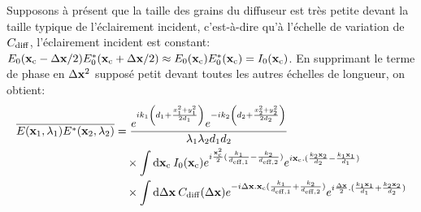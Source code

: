Supposons à présent que la taille des grains du diffuseur est très petite devant la taille typique de l'éclairement incident, c'est-à-dire qu'à l'échelle de variation de $C_{\mathrm{diff}}$, l'éclairement incident est constant: $E_0(\mathbf{x}_{\mathrm{c}}-\Delta\mathbf{x}/2) E_0^*(\mathbf{x}_{\mathrm{c}}+\Delta\mathbf{x}/2) \approx E_0(\mathbf{x}_{\mathrm{c}}) E_0^*(\mathbf{x}_{\mathrm{c}}) = I_0(\mathbf{x}_{\mathrm{c}})$. En supprimant le terme de phase en $\Delta\mathbf{x}^2$ supposé petit devant toutes les autres échelles de longueur, on obtient:
\begin{align}
\overline{E(\mathbf{x}_1,\lambda_1)E^*(\mathbf{x}_2,\lambda_2)} &= \frac{e^{ik_1\left( d_1 + \frac{x_1^2+y_1^2}{2d_1} \right)} e^{-ik_2 \left( d_2 + \frac{x_2^2+y_2^2}{2d_2}\right)}}{\lambda_1 \lambda_2 d_1 d_2} \\
\nonumber & \quad \times \int{\mathop{}\mathopen{}\mathrm{d}\mathbf{x}_{\mathrm{c}}\: I_0(\mathbf{x}_{\mathrm{c}}) e^{i\frac{\mathbf{x}_{\mathrm{c}}^2}{2}(\frac{k_1}{d_{\mathrm{eff,1}}} - \frac{k_2}{d_{\mathrm{eff,2}}})} e^{i \mathbf{x}_{\mathrm{c}}. (\frac{k_2 \mathbf{x}_2}{d_2}-\frac{k_1 \mathbf{x}_1}{d_1})}} \\
\nonumber & \quad \times \int{\mathop{}\mathopen{}\mathrm{d}\Delta\mathbf{x}\: C_{\mathrm{diff}}(\Delta\mathbf{x}) e^{-i\Delta\mathbf{x}. \mathbf{x}_{\mathrm{c}}(\frac{k_1}{d_{\mathrm{eff,1}}} + \frac{k_2}{d_{\mathrm{eff,2}}})} e^{i\frac{\Delta\mathbf{x}}{2}. (\frac{k_1 \mathbf{x}_1}{d_1} +\frac{k_2 \mathbf{x}_2}{d_2})}}
\end{align}